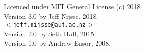 \documentclass[a4paper]{book}
\begin{document}
 Licenced under MIT General License (c) 2018 \\     
 
 Version 3.0 by Jeff Nijsse, 2018.\\
 $<$\texttt{jeff.nijsse@aut.ac.nz}$>$\\
 Version 2.0 by Seth Hall, 2015.\\
 Version 1.0 by Andrew Ensor, 2008.
 
 
    \tableofcontents

  \mainmatter
%    
%    
%    
%    
%    
%    

  \appendix
%    
\end{document}
